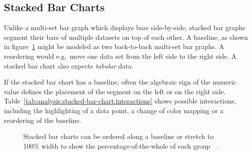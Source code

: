 \subsection{Stacked Bar Charts}

Unlike a multi-set bar graph which displays bars side-by-side, stacked bar graphs segment their bars of multiple datasets on top of each other.
A baseline, as shown in figure~\ref{fig:analysis:stacked-bar-chart} might be modeled as two back-to-back multi-set bar graphs. A reordering would e.g.\ move one data set from the left side to the right side.
A stacked bar chart also expects \emph{tabular} data.

If the stacked bar chart has a baseline, often the algebraic sign of the numeric value defines the placement of the segment on the left or on the right side.
Table~\ref{tab:analysis:stacked-bar-chart:interactions} shows possible interactions, including the highlighting of a data point, a change of color mapping or a reordering of the baseline.

\begin{figure}
  \centering
  \qquad
  \caption{Stacked bar charts can be ordered along a baseline or stretch to 100\% width to show the percentage-of-the-whole of each group~\parencite{Mann2017}~\parencite{Peltier2017}.}%
  \label{fig:analysis:stacked-bar-chart}
\end{figure}

